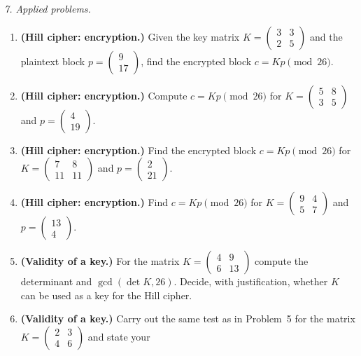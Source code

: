 \bigskip
\emph{7. Applied problems.}
\begin{enumerate}[label=\arabic*.,]
\item \textbf{(Hill cipher: encryption.)} Given the key matrix
$K=\begin{pmatrix}3 & 3\\ 2 & 5\end{pmatrix}$ and the plaintext block
$p=\begin{pmatrix}9\\17\end{pmatrix}$, find the encrypted block
$c = Kp \pmod{26}$.
\item \textbf{(Hill cipher: encryption.)} Compute $c=Kp \pmod{26}$ for
$K=\begin{pmatrix}5 & 8\\ 3 & 5\end{pmatrix}$ and
$p=\begin{pmatrix}4\\19\end{pmatrix}$.
\item \textbf{(Hill cipher: encryption.)} Find the encrypted block
$c=Kp \pmod{26}$ for $K=\begin{pmatrix}7 & 8\\ 11 & 11\end{pmatrix}$ and
$p=\begin{pmatrix}2\\21\end{pmatrix}$.
\item \textbf{(Hill cipher: encryption.)} Find $c=Kp \pmod{26}$ for
$K=\begin{pmatrix}9 & 4\\ 5 & 7\end{pmatrix}$ and
$p=\begin{pmatrix}13\\4\end{pmatrix}$.
\item \textbf{(Validity of a key.)} For the matrix
$K=\begin{pmatrix}4 & 9\\ 6 & 13\end{pmatrix}$ compute the determinant and
$\gcd(\det K,26)$. Decide, with justification, whether $K$ can be used as a key
for the Hill cipher.
\item \textbf{(Validity of a key.)} Carry out the same test as in Problem~5 for
the matrix $K=\begin{pmatrix}2 & 3\\ 4 & 6\end{pmatrix}$ and state your

\end{enumerate}
